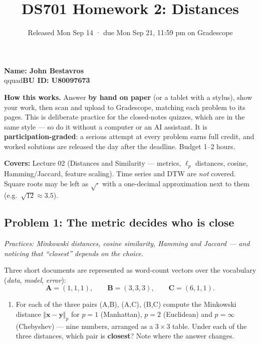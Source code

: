\documentclass[
  11pt,
]{article}
\title{DS701 Homework 2: Distances}
\subtitle{Released Mon Sep 14 · due Mon Sep 21, 11:59 pm on Gradescope}
\author{}
\date{}
\providecommand{\tightlist}{%
  \setlength{\itemsep}{0pt}\setlength{\parskip}{0pt}}
\begin{document}
\maketitle


\noindent\textbf{Name: John Bestavros}\\qquad\textbf{BU ID: U80097673}\
\vspace{6pt}

\textbf{How this works.} Answer \textbf{by hand on paper} (or a tablet
with a stylus), show your work, then scan and upload to Gradescope,
matching each problem to its pages. This is deliberate practice for the
closed-notes quizzes, which are in the same style --- so do it without a
computer or an AI assistant. It is \textbf{participation-graded}: a
serious attempt at every problem earns full credit, and worked solutions
are released the day after the deadline. Budget 1--2 hours.

\textbf{Covers:} Lecture 02 (Distances and Similarity --- metrics,
\(\ell_p\) distances, cosine, Hamming/Jaccard, feature scaling). Time
series and DTW are \emph{not} covered. Square roots may be left as
\(\sqrt{\cdot}\) with a one-decimal approximation next to them
(e.g.~\(\sqrt{12}\approx 3.5\)).

\subsection{Problem 1: The metric decides who is
close}\label{problem-1-the-metric-decides-who-is-close}

\emph{Practices: Minkowski distances, cosine similarity, Hamming and
Jaccard --- and noticing that ``closest'' depends on the choice.}

Three short documents are represented as word-count vectors over the
vocabulary (\emph{data}, \emph{model}, \emph{error}):
\[\mathbf{A} = (1, 1, 1),\qquad \mathbf{B} = (3, 3, 3),\qquad \mathbf{C} = (6, 1, 1).\]

\begin{enumerate}
\def\labelenumi{(\alph{enumi})}
\tightlist
\item
  For each of the three pairs (A,B), (A,C), (B,C) compute the Minkowski
  distance \(\Vert\mathbf{x}-\mathbf{y}\Vert_p\) for \(p = 1\)
  (Manhattan), \(p = 2\) (Euclidean) and \(p = \infty\) (Chebyshev) ---
  nine numbers, arranged as a \(3\times3\) table. Under each of the
  three distances, which pair is \textbf{closest}? Note where the answer
  changes.
\end{enumerate}
\end{document}
